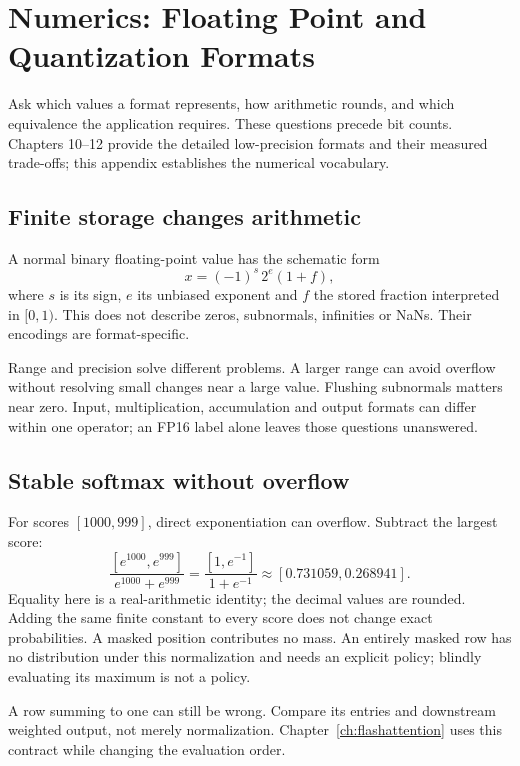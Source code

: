 \chapter{Numerics: Floating Point and Quantization Formats}\label{app:numerics}
\begin{ChapterIntent}
Ask which values a format represents, how arithmetic rounds, and which
equivalence the application requires. These questions precede bit counts.
Chapters 10--12 provide the detailed low-precision formats and their
measured trade-offs; this appendix establishes the numerical vocabulary.
\end{ChapterIntent}

\section{Finite storage changes arithmetic}
A normal binary floating-point value has the schematic form
\[
 x=(-1)^s\,2^e(1+f),
\]
where $s$ is its sign, $e$ its unbiased exponent and $f$ the stored fraction
interpreted in $[0,1)$. This does not describe zeros, subnormals, infinities
or NaNs. Their encodings are format-specific.

Range and precision solve different problems. A larger range can avoid
overflow without resolving small changes near a large value. Flushing
subnormals matters near zero. Input, multiplication, accumulation and
output formats can differ within one operator; an FP16 label alone leaves
those questions unanswered.

\section{Stable softmax without overflow}
For scores $[1000,999]$, direct exponentiation can overflow. Subtract the
largest score:
\[
 \frac{[e^{1000},e^{999}]}{e^{1000}+e^{999}}
 =\frac{[1,e^{-1}]}{1+e^{-1}}
 \approx[0.731059,0.268941].
\]
Equality here is a real-arithmetic identity; the decimal values are rounded.
Adding the same finite constant to every score does not change exact
probabilities. A masked position contributes no mass. An entirely masked
row has no distribution under this normalization and needs an explicit
policy; blindly evaluating its maximum is not a policy.

A row summing to one can still be wrong. Compare its entries and downstream
weighted output, not merely normalization. Chapter~\ref{ch:flashattention}
uses this contract while changing the evaluation order.

